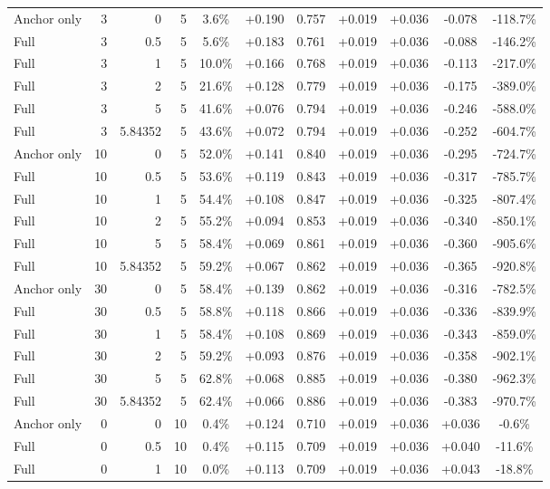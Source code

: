 \begin{table}[htbp]
\begin{tabular}{lrrrccccccc}
Anchor only & 3 & 0 & 5 & 3.6\% & +0.190 & 0.757 & +0.019 & +0.036 & -0.078 & -118.7\% \\
Full & 3 & 0.5 & 5 & 5.6\% & +0.183 & 0.761 & +0.019 & +0.036 & -0.088 & -146.2\% \\
Full & 3 & 1 & 5 & 10.0\% & +0.166 & 0.768 & +0.019 & +0.036 & -0.113 & -217.0\% \\
Full & 3 & 2 & 5 & 21.6\% & +0.128 & 0.779 & +0.019 & +0.036 & -0.175 & -389.0\% \\
Full & 3 & 5 & 5 & 41.6\% & +0.076 & 0.794 & +0.019 & +0.036 & -0.246 & -588.0\% \\
Full & 3 & 5.84352 & 5 & 43.6\% & +0.072 & 0.794 & +0.019 & +0.036 & -0.252 & -604.7\% \\
Anchor only & 10 & 0 & 5 & 52.0\% & +0.141 & 0.840 & +0.019 & +0.036 & -0.295 & -724.7\% \\
Full & 10 & 0.5 & 5 & 53.6\% & +0.119 & 0.843 & +0.019 & +0.036 & -0.317 & -785.7\% \\
Full & 10 & 1 & 5 & 54.4\% & +0.108 & 0.847 & +0.019 & +0.036 & -0.325 & -807.4\% \\
Full & 10 & 2 & 5 & 55.2\% & +0.094 & 0.853 & +0.019 & +0.036 & -0.340 & -850.1\% \\
Full & 10 & 5 & 5 & 58.4\% & +0.069 & 0.861 & +0.019 & +0.036 & -0.360 & -905.6\% \\
Full & 10 & 5.84352 & 5 & 59.2\% & +0.067 & 0.862 & +0.019 & +0.036 & -0.365 & -920.8\% \\
Anchor only & 30 & 0 & 5 & 58.4\% & +0.139 & 0.862 & +0.019 & +0.036 & -0.316 & -782.5\% \\
Full & 30 & 0.5 & 5 & 58.8\% & +0.118 & 0.866 & +0.019 & +0.036 & -0.336 & -839.9\% \\
Full & 30 & 1 & 5 & 58.4\% & +0.108 & 0.869 & +0.019 & +0.036 & -0.343 & -859.0\% \\
Full & 30 & 2 & 5 & 59.2\% & +0.093 & 0.876 & +0.019 & +0.036 & -0.358 & -902.1\% \\
Full & 30 & 5 & 5 & 62.8\% & +0.068 & 0.885 & +0.019 & +0.036 & -0.380 & -962.3\% \\
Full & 30 & 5.84352 & 5 & 62.4\% & +0.066 & 0.886 & +0.019 & +0.036 & -0.383 & -970.7\% \\
Anchor only & 0 & 0 & 10 & 0.4\% & +0.124 & 0.710 & +0.019 & +0.036 & +0.036 & -0.6\% \\
Full & 0 & 0.5 & 10 & 0.4\% & +0.115 & 0.709 & +0.019 & +0.036 & +0.040 & -11.6\% \\
Full & 0 & 1 & 10 & 0.0\% & +0.113 & 0.709 & +0.019 & +0.036 & +0.043 & -18.8\% \\

\end{tabular}
\end{table}
